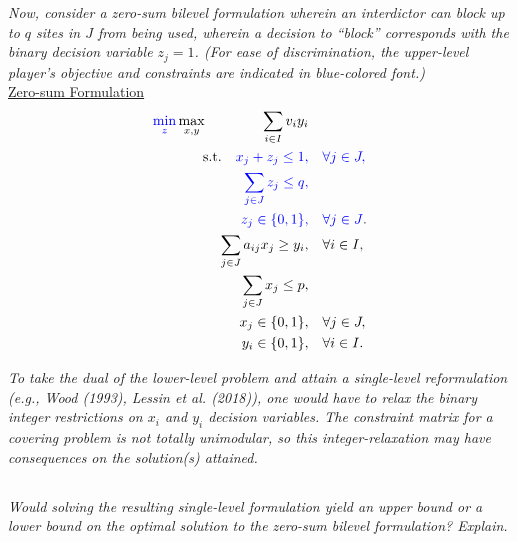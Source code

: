 \documentclass[12pt]{amsart}
\begin{document}
\begin{center}
\begin{minipage}{0.75\linewidth}
		
\textit{Now, consider a zero-sum bilevel formulation wherein an interdictor can block up to $q$ sites
	in $J$ from being used, wherein a decision to “block” corresponds with the binary decision
	variable $z_j = 1$. (For ease of discrimination, the upper-level player’s objective and
	constraints are indicated in {\color{blue} blue-colored font}.)} \\
	
	\underline{Zero-sum Formulation}
	\begin{align*}
		{\color{blue}\min_z}\max_{x,y} \qquad\qquad \sum_{i\in I} v_iy_i& \\
		\text{s.t.}\quad
		{\color{blue} x_j+z_j \leq 1,}& \quad {\color{blue}\forall j\in J,}\\
		{\color{blue} \sum_{j\in J}z_j\leq q,}&  \\
		{\color{blue} z_j\in \{0,1\},}& {\color{blue}\quad\forall j\in J}.  \\
		\sum_{j\in J} a_{ij}x_j \geq y_i,& \quad \forall i\in I, \\
		\sum_{j\in J} x_j \leq p,& \\
		x_j \in \{0,1\},& \quad \forall j\in J, \\
		y_i \in \{0,1\},& \quad \forall i\in I. \\
	\end{align*}
	
\textit{To take the dual of the lower-level problem and attain a single-level reformulation (e.g.,
	Wood (1993), Lessin et al. (2018)), one would have to relax the binary integer restrictions
	on $x_i$ and $y_i$ decision variables. The constraint matrix for a covering problem is not totally
	unimodular, so this integer-relaxation may have consequences on the solution(s) attained.} \\

\end{minipage}
\end{center}		

\subsection{}
\textit{Would solving the resulting single-level formulation yield an upper bound or a lower bound
on the optimal solution to the zero-sum bilevel formulation? Explain.} \\
\end{document}
